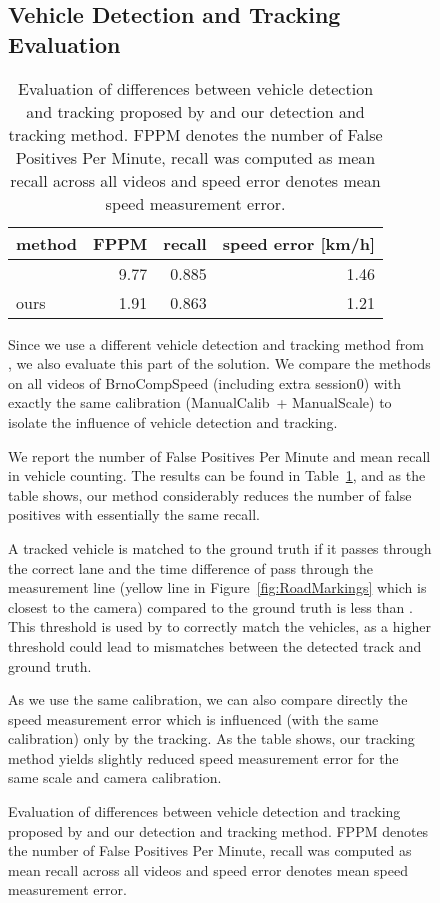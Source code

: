 \documentclass[]{elsarticle}
\newlength{\tabwidth}
\newcommand{\ManualCalib}{ManualCalib}
\newcommand{\ManualScale}{ManualScale}
\begin{document}
\begin{figure}[h]
\subsection{Vehicle Detection and Tracking Evaluation} \label{sec:TrackingEval}

\begin{table}[t]
	\centering
	\caption{Evaluation of differences between vehicle detection and tracking proposed by  \cite{Dubska2014} and our detection and tracking method. FPPM denotes the number of False Positives Per Minute, recall was computed as mean recall across all videos and speed error denotes mean speed measurement error.}  \label{tab:CountingResults}
	\vspace{2mm}
	\setlength{\tabwidth}{0.90\linewidth}
	\small
	\begin{tabular}{l r r r}
		\toprule
		\textbf{method} & \textbf{FPPM} & \textbf{recall} & \textbf{speed error [km/h]}\\
		\midrule
		\cite{Dubska2014} & 9.77 & 0.885 & 1.46\\
		ours & 1.91 & 0.863 & 1.21\\	
		\bottomrule
	\end{tabular}
\end{table}


Since we use a different vehicle detection and tracking method from \cite{Dubska2014}, we also evaluate this part of the solution. We compare the methods on all videos of BrnoCompSpeed (including extra session0) with exactly the same calibration (\ManualCalib\ + \ManualScale) to isolate the influence of vehicle detection and tracking. 

We report the number of False Positives Per Minute and mean recall in vehicle counting. The results can be found in Table~\ref{tab:CountingResults}, and as the table shows, our method considerably reduces the number of false positives with essentially the same recall.

A tracked vehicle is matched to the ground truth if it passes through the correct lane and the time difference of pass through the measurement line (yellow line in Figure~\ref{fig:RoadMarkings} which is closest to the camera) compared to the ground truth is less than . This threshold is used by \cite{BrnoCompSpeed} to correctly match the vehicles, as a higher threshold could lead to mismatches between the detected track and ground truth.

As we use the same calibration, we can also compare directly the speed measurement error which is influenced (with the same calibration) only by the tracking. As the table shows, our tracking method yields slightly reduced speed measurement error for the same scale and camera calibration.




\end{figure}
\end{document}
